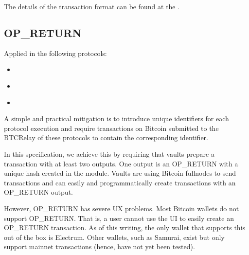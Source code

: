 \documentclass[a4paper,10pt,english]{sphinxmanual}
\begin{document}
The details of the transaction format can be found at the .


\subsection{OP\_RETURN}
\label{\detokenize{security_performance/security-analysis:op-return}}\label{\detokenize{security_performance/security-analysis:id2}}
Applied in the following protocols:
\begin{itemize}
\item {} 
{\hyperref[\detokenize{spec/redeem:redeem-protocol}]{}}

\item {} 
{\hyperref[\detokenize{spec/replace:replace-protocol}]{}}

\item {} 
{\hyperref[\detokenize{spec/refund:refund-protocol}]{}}

\end{itemize}

A simple and practical mitigation is to introduce unique identifiers for each protocol execution and require transactions on Bitcoin submitted to the BTC\sphinxhyphen{}Relay of these protocols to contain the corresponding identifier.

In this specification, we achieve this by requiring that vaults prepare a transaction with at least two outputs. One output is an OP\_RETURN with a unique hash created in the {\hyperref[\detokenize{spec/security:security}]{}} module.
Vaults are using Bitcoin full\sphinxhyphen{}nodes to send transactions and can easily and programmatically create transactions with an OP\_RETURN output.


However, OP\_RETURN has severe UX problems. Most Bitcoin wallets do not support OP\_RETURN. That is, a user cannot use the UI to easily create an OP\_RETURN transaction.
As of this writing, the only wallet that supports this out of the box is Electrum. Other wallets, such as Samurai, exist but only support mainnet transactions (hence, have not yet been tested).
\end{document}
